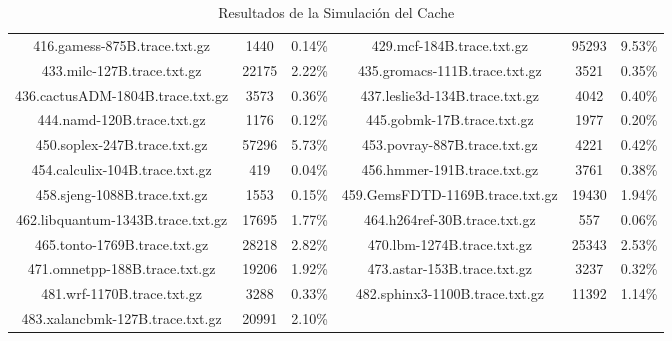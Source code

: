 \begin{table}[H]
\begin{tabular}{|c|c|c|c|c|c|}
416.gamess-875B.trace.txt.gz & 1440 & 0.14\% & 429.mcf-184B.trace.txt.gz & 95293 & 9.53\% \\
433.milc-127B.trace.txt.gz & 22175 & 2.22\% & 435.gromacs-111B.trace.txt.gz & 3521 & 0.35\% \\
436.cactusADM-1804B.trace.txt.gz & 3573 & 0.36\% & 437.leslie3d-134B.trace.txt.gz & 4042 & 0.40\% \\
444.namd-120B.trace.txt.gz & 1176 & 0.12\% & 445.gobmk-17B.trace.txt.gz & 1977 & 0.20\% \\
450.soplex-247B.trace.txt.gz & 57296 & 5.73\% & 453.povray-887B.trace.txt.gz & 4221 & 0.42\% \\
454.calculix-104B.trace.txt.gz & 419 & 0.04\% & 456.hmmer-191B.trace.txt.gz & 3761 & 0.38\% \\
458.sjeng-1088B.trace.txt.gz & 1553 & 0.15\% & 459.GemsFDTD-1169B.trace.txt.gz & 19430 & 1.94\% \\
462.libquantum-1343B.trace.txt.gz & 17695 & 1.77\% & 464.h264ref-30B.trace.txt.gz & 557 & 0.06\% \\
465.tonto-1769B.trace.txt.gz & 28218 & 2.82\% & 470.lbm-1274B.trace.txt.gz & 25343 & 2.53\% \\
471.omnetpp-188B.trace.txt.gz & 19206 & 1.92\% & 473.astar-153B.trace.txt.gz & 3237 & 0.32\% \\
481.wrf-1170B.trace.txt.gz & 3288 & 0.33\% & 482.sphinx3-1100B.trace.txt.gz & 11392 & 1.14\% \\
483.xalancbmk-127B.trace.txt.gz & 20991 & 2.10\% & & & &  \\
\hline
\end{tabular}
\caption{Resultados de la Simulación del Cache}
\label{tab:cache_results}
\end{table}